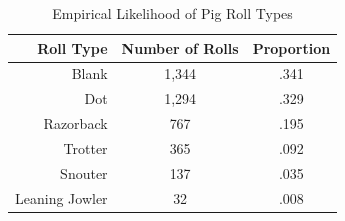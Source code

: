 \documentclass{article}
\begin{document}
\begin{table}[htbp]
\centering
\begin{tabular}{|r|c|c|}
\hline
Roll Type & Number of Rolls & Proportion \\
\hline
Blank & 1,344 & .341 \\
\hline
Dot & 1,294 & .329 \\
\hline
Razorback & 767 & .195 \\
\hline
Trotter & 365 & .092 \\
\hline
Snouter & 137 & .035 \\
\hline
Leaning Jowler & 32 & .008 \\
\hline
\end{tabular}
\caption{Empirical Likelihood of Pig Roll Types}
\label{tbl:pigout}
\end{table}
\end{document}
